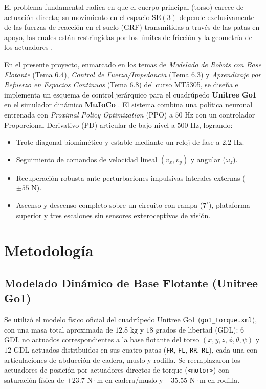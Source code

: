\documentclass[12pt,a4paper]{article}
\begin{document}
El problema fundamental radica en que el cuerpo principal (torso) carece de actuación directa; su movimiento en el espacio $\mathrm{SE}(3)$ depende exclusivamente de las fuerzas de reacción en el suelo (GRF) transmitidas a través de las patas en apoyo, las cuales están restringidas por los límites de fricción y la geometría de los actuadores \cite{tedrake2024}.

En el presente proyecto, enmarcado en los temas de \textit{Modelado de Robots con Base Flotante} (Tema 6.4), \textit{Control de Fuerza/Impedancia} (Tema 6.3) y \textit{Aprendizaje por Refuerzo en Espacios Continuos} (Tema 6.8) del curso MT5305, se diseña e implementa un esquema de control jerárquico para el cuadrúpedo \textbf{Unitree Go1} en el simulador dinámico \textbf{MuJoCo} \cite{todorov2012}. El sistema combina una política neuronal entrenada con \textit{Proximal Policy Optimization} (PPO) \cite{schulman2017} a $50\text{ Hz}$ con un controlador Proporcional-Derivativo (PD) articular de bajo nivel a $500\text{ Hz}$, logrando:
\begin{itemize}
    \item Trote diagonal biomimético y estable mediante un reloj de fase a $2.2\text{ Hz}$.
    \item Seguimiento de comandos de velocidad lineal $(v_x, v_y)$ y angular ($\omega_z$).
    \item Recuperación robusta ante perturbaciones impulsivas laterales externas ($\pm 55\text{ N}$).
    \item Ascenso y descenso completo sobre un circuito con rampa ($7^\circ$), plataforma superior y tres escalones sin sensores exteroceptivos de visión.
\end{itemize}

\section{Metodología}

\subsection{Modelado Dinámico de Base Flotante (Unitree Go1)}
Se utilizó el modelo físico oficial del cuadrúpedo Unitree Go1 (\texttt{go1\_torque.xml}), con una masa total aproximada de $12.8\text{ kg}$ y $18$ grados de libertad (GDL): $6$ GDL no actuados correspondientes a la base flotante del torso $(x, y, z, \phi, \theta, \psi)$ y $12$ GDL actuados distribuidos en sus cuatro patas (\texttt{FR}, \texttt{FL}, \texttt{RR}, \texttt{RL}), cada una con articulaciones de abducción de cadera, muslo y rodilla. Se reemplazaron los actuadores de posición por actuadores directos de torque (\texttt{<motor>}) con saturación física de $\pm 23.7\text{ N}\cdot\text{m}$ en cadera/muslo y $\pm 35.55\text{ N}\cdot\text{m}$ en rodilla.
\end{document}
